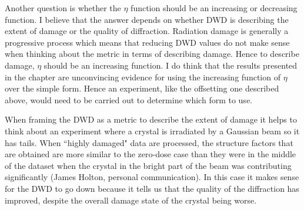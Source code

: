 Another question is whether the $\eta$ function should be an increasing or decreasing function.
I believe that the answer depends on whether DWD is describing the extent of damage or the quality of diffraction.
Radiation damage is generally a progressive process which means that reducing DWD values do not make sense when thinking about the metric in terms of describing damage.
Hence to describe damage, $\eta$ should be an increasing function.
I do think that the results presented in the chapter are unconvincing evidence for using the increasing function of $\eta$ over the simple form.
Hence an experiment, like the offsetting one described above, would need to be carried out to determine which form to use.

When framing the DWD as a metric to describe the extent of damage it helps to think about an experiment where a crystal is irradiated by a Gaussian beam so it has tails.
When ``highly damaged" data are processed, the structure factors that are obtained are more similar to the zero-dose case than they were in the middle of the dataset when the crystal in the bright part of the beam was contributing significantly (James Holton, personal communication).
In this case it makes sense for the DWD to go down because it tells us that the quality of the diffraction has improved, despite the overall damage state of the crystal being worse.
